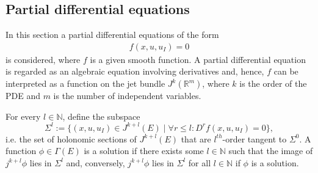 \subsection{Partial differential equations}

    In this section a partial differential equations of the form
    \begin{gather}
        \label{diff:pde_jet}
        f(x,u,u_I) = 0
    \end{gather}
    is considered, where $f$ is a given smooth function. A partial differential equation is regarded as an algebraic equation involving derivatives and, hence, $f$ can be interpreted as a function on the jet bundle $J^k(\mathbb{R}^m)$, where $k$ is the order of the PDE and $m$ is the number of independent variables.

    \begin{remark}
        For every $l\in\mathbb{N}$, define the subspace \[\Sigma^l:=\{(x,u,u_I)\in J^{k+l}(E)\mid\forall r\leq l:D^rf(x,u,u_I)= 0\},\] i.e. the set of holonomic sections of $J^{k+l}(E)$ that are $l^{th}$-order tangent to $\Sigma^0$. A function $\phi\in\Gamma(E)$ is a solution if there exists some $l\in\mathbb{N}$ such that the image of $j^{k+l}\phi$ lies in $\Sigma^l$ and, conversely, $j^{k+l}\phi$ lies in $\Sigma^l$ for all $l\in\mathbb{N}$ if $\phi$ is a solution.
    \end{remark}

